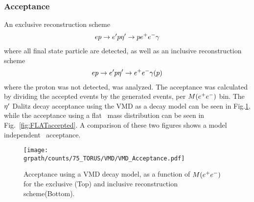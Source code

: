 \subsubsection{Acceptance}\label{sec.reconstruction}
An exclusive reconstruction scheme
\begin{align}
ep\to e'p \eta^{\prime} \rightarrow p e^+e^- \gamma 
\end{align}
where all final state particle are detected, as well as an inclusive reconstruction scheme
\begin{align}
ep\to e'p \eta^{\prime} \rightarrow e^+e^- \gamma (p)
\end{align}
where the proton was not detected, was analyzed. 
The acceptance was calculated by dividing the accepted events by the generated events, per $M(\epem)$ bin. The $\eta^{\prime}$ Dalitz decay acceptance using the VMD as a decay model can be seen in Fig.\ref{fig:VMDaccepted}, while the acceptance using a flat \epemT \ mass distribution can be seen in Fig.~\ref{fig:FLATaccepted}. A comparison of these two figures shows a model independent \epemT \ acceptance. 
\FloatBarrier

\begin{figure}[h!]\begin{center}
		\texttt{[image: \\grpath/counts/75\_TORUS/VMD/VMD\_Acceptance.pdf]}
		\caption[Acceptance, as a function of $M(\epem)$]{\label{fig:VMDaccepted}{Acceptance using a VMD decay model, as a function of $M(\epem)$ for the exclusive (Top) and inclusive reconstruction scheme(Bottom). }}
\end{center}\end{figure}

